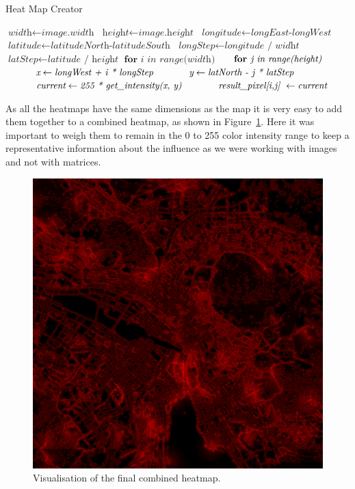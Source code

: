 \documentclass[letterpaper]{article}
\begin{document}
\begin{algorithm}
    \caption{Heat Map Creator}\label{fig:heatMapCreation}
    \begin{algorithmic}[1]
        	 \State $\textit{width} \gets \textit{image.width}$
        	 \State $\textit{height} \gets \textit{image.height}$
        	 \State $\textit{longitude} \gets \textit{longEast-longWest}$
        	 \State $\textit{latitude} \gets \textit{latitudeNorth-latitudeSouth}$
            \State $\textit{longStep} \gets \textit{longitude / widht}$
            \State $\textit{latStep} \gets \textit{latitude / height}$
            \State $\textbf{for } \textit{i in range(width)} $
            \State $\indent \textbf{for } \textit{j in range(height)} $
            \State $\indent \indent \textit{x} \gets \textit{longWest + i * longStep}$
            \State $\indent \indent \textit{y} \gets \textit{latNorth - j * latStep}$
            \State $\indent \indent \textit{current} \gets \textit{255 * get\_intensity(x, y)}$
            \State $\indent \indent \textit{result\_pixel[i,j] } \gets \textit{current}$
        \EndProcedure
    \end{algorithmic}
\end{algorithm}

\indent As all the heatmaps have the same dimensions as the map it is very easy to add them together to a combined heatmap, as shown in Figure~\ref{fig:ZurichAllHeatmaps}. Here it was important to weigh them to remain in the 0 to 255 color intensity range to keep a representative information about the influence as we were working with images and not with matrices.


\begin{figure}[H]
    \centering
    \includegraphics[width=.9\linewidth]{images/combined_heatmap.png}
    \caption{Visualisation of the final combined heatmap.}
    \label{fig:ZurichAllHeatmaps}
\end{figure}
\end{document}
